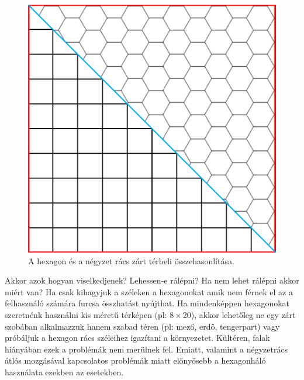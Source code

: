 \begin{figure}[h]
\centering
\includegraphics[scale=0.1]{kepek/img24.png}
\caption{A hexagon és a négyzet rács zárt térbeli összehasonlítása.}
\label{fig:img24}
\end{figure}

\noindent Akkor azok hogyan viselkedjenek? 
\newline Lehessen-e rálépni?
\newline Ha nem lehet rálépni akkor miért van?
\newline
\newline Ha csak kihagyjuk a széleken a hexagonokat amik nem férnek el az a felhasználó számára furcsa összhatást nyújthat.
\newline
\newline Ha mindenképpen hexagonokat  szeretnénk használni kis méretű térképen (pl: $8 \times 20$), akkor lehetőleg ne egy zárt szobában alkalmazzuk hanem szabad téren (pl: mező, erdő, tengerpart) vagy próbáljuk a hexagon rács széleihez igazítani a környezetet.
\newline
\newline Kültéren, falak hiányában ezek a problémák nem merülnek fel. Emiatt, valamint a négyzetrács átlós mozgásával kapcsolatos problémák miatt előnyösebb a hexagonháló használata ezekben az esetekben.

